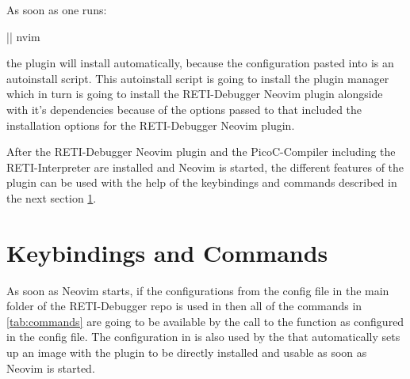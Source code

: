 \documentclass{report}
\begin{document}
As soon as one runs:

\begin{terminal}
  |\prompt| nvim
\end{terminal}

the plugin will install automatically, because the configuration pasted into  is an autoinstall script. This autoinstall script is going to install the  \alert{plugin manager} which in turn is going to install the RETI-Debugger Neovim plugin alongside with it's dependencies because of the options passed to  that included the installation options for the RETI-Debugger Neovim plugin.

After the RETI-Debugger Neovim plugin and the PicoC-Compiler including the RETI-Interpreter are installed and Neovim is started, the different features of the plugin can be used with the help of the keybindings and commands described in the next section \ref{sec:keybindings and commands}.

\section{Keybindings and Commands}
\label{sec:keybindings and commands}

As soon as Neovim starts, if the configurations from the config file  in the main folder of the RETI-Debugger repo is used in  then all of the commands in \ref{tab:commands} are going to be available by the call to the  function as configured in the config file. The configuration in  is also used by the  that automatically sets up an image with the plugin to be directly installed and usable as soon as Neovim is started.


\newcommand{\loadretiexample}{Open a menu with a listing of example programs and open one with \inlinebox{Enter}}
\newcommand{\compilepicocbuffer}{Compile PicoC code in buffer to RETI}
\newcommand{\startretibuffer}{Start RETI code in the current buffer in the RETI-Debugger. Mounts the window layout, starts the RETI-Interpreter asynchronously and sets buffer and not yet set global keybindings keybindings}
\end{document}
